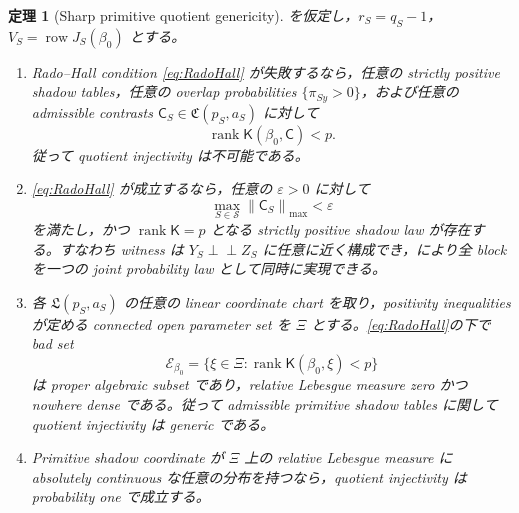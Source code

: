 \documentclass[11pt,a4paper]{ltjsarticle}
\newtheorem{theorem}{定理}[section]
\theoremstyle{remark}
\newcommand{\ind}{\perp\!\!\!\perp}
\newcommand{\norm}[1]{\left\lVert#1\right\rVert}
\newcommand{\cS}{\mathcal S}
\newcommand{\rank}{\operatorname{rank}}
\newcommand{\row}{\operatorname{row}}
\begin{document}
\begin{theorem}[Sharp primitive quotient genericity]\label{thm:primitivegenericity}
を仮定し，$r_S=q_S-1$，$V_S=\row J_S(\beta_0)$ とする。
\begin{enumerate}[label=(\roman*)]
\item Rado--Hall condition \eqref{eq:RadoHall} が失敗するなら，任意の strictly positive shadow tables，任意の overlap probabilities $\{\pi_{Sy}>0\}$，および任意の admissible contrasts $\mathsf C_S\in\mathfrak C(p_S,a_S)$ に対して
\[
\rank\mathsf K(\beta_0,\mathsf C)<p.
\]
従って quotient injectivity は不可能である。
\item \eqref{eq:RadoHall} が成立するなら，任意の $\varepsilon>0$ に対して
\[
\max_{S\in\cS}\norm{\mathsf C_S}_{\max}<\varepsilon
\]
を満たし，かつ $\rank\mathsf K=p$ となる strictly positive shadow law が存在する。すなわち witness は $Y_S\ind Z_S$ に任意に近く構成でき，により全 block を一つの joint probability law として同時に実現できる。
\item 各 $\mathfrak L(p_S,a_S)$ の任意の linear coordinate chart を取り，positivity inequalities が定める connected open parameter set を $\Xi$ とする。\eqref{eq:RadoHall}の下で bad set
\begin{equation}
\mathcal E_{\beta_0}
=\{\xi\in\Xi:\rank\mathsf K(\beta_0,\xi)<p\}
\label{eq:primitivebadset}
\end{equation}
は proper algebraic subset であり，relative Lebesgue measure zero かつ nowhere dense である。従って admissible primitive shadow tables に関して quotient injectivity は generic である。
\item Primitive shadow coordinate が $\Xi$ 上の relative Lebesgue measure に absolutely continuous な任意の分布を持つなら，quotient injectivity は probability one で成立する。
\end{enumerate}
\end{theorem}
\end{document}
